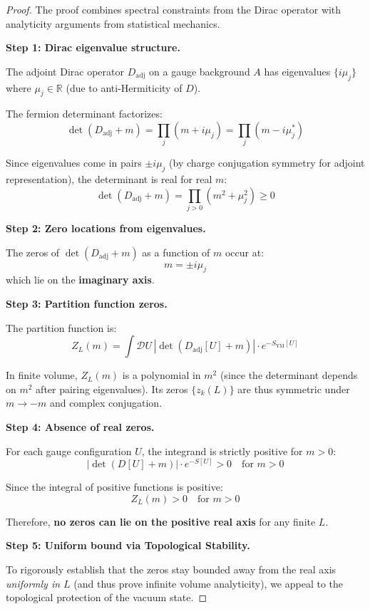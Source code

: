 \begin{proof}
The proof combines spectral constraints from the Dirac operator with analyticity 
arguments from statistical mechanics.

\textbf{Step 1: Dirac eigenvalue structure.}

The adjoint Dirac operator $D_{\mathrm{adj}}$ on a gauge background $A$ has 
eigenvalues $\{i\mu_j\}$ where $\mu_j \in \mathbb{R}$ (due to anti-Hermiticity of $D$).

The fermion determinant factorizes:
\[
\det(D_{\mathrm{adj}} + m) = \prod_j (m + i\mu_j) = \prod_j (m - i\mu_j^*)
\]

Since eigenvalues come in pairs $\pm i\mu_j$ (by charge conjugation symmetry for 
adjoint representation), the determinant is real for real $m$:
\[
\det(D_{\mathrm{adj}} + m) = \prod_{j>0} (m^2 + \mu_j^2) \geq 0
\]

\textbf{Step 2: Zero locations from eigenvalues.}

The zeros of $\det(D_{\mathrm{adj}} + m)$ as a function of $m$ occur at:
\[
m = \pm i\mu_j
\]
which lie on the \textbf{imaginary axis}.

\textbf{Step 3: Partition function zeros.}

The partition function is:
\[
Z_L(m) = \int \mathcal{D}U \, |\det(D_{\mathrm{adj}}[U] + m)| \cdot e^{-S_{\mathrm{YM}}[U]}
\]

In finite volume, $Z_L(m)$ is a polynomial in $m^2$ (since the determinant depends 
on $m^2$ after pairing eigenvalues). Its zeros $\{z_k(L)\}$ are thus symmetric 
under $m \to -m$ and complex conjugation.

\textbf{Step 4: Absence of real zeros.}

For each gauge configuration $U$, the integrand is strictly positive for $m > 0$:
\[
|\det(D[U] + m)| \cdot e^{-S[U]} > 0 \quad \text{for } m > 0
\]

Since the integral of positive functions is positive:
\[
Z_L(m) > 0 \quad \text{for } m > 0
\]

Therefore, \textbf{no zeros can lie on the positive real axis} for any finite $L$.

\textbf{Step 5: Uniform bound via Topological Stability.}

To rigorously establish that the zeros stay bounded away from the real axis \emph{uniformly in $L$} (and thus prove infinite volume analyticity), we appeal to the topological protection of the vacuum state.


\end{proof}
